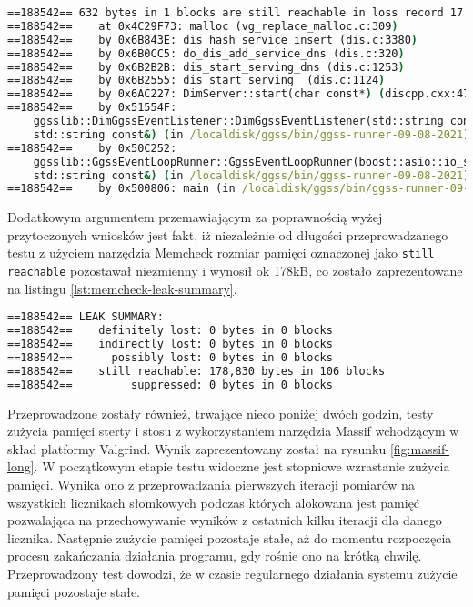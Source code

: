 \begin{lstlisting}[language=cmd,caption={Przykładowy, powodowany przez bibliotekę DIM, błąd raportowany przez narzędzie Memcheck},frame=single, label={lst:memcheck-error}]
==188542== 632 bytes in 1 blocks are still reachable in loss record 17 of 37
==188542==    at 0x4C29F73: malloc (vg_replace_malloc.c:309)
==188542==    by 0x6B843E: dis_hash_service_insert (dis.c:3380)
==188542==    by 0x6B0CC5: do_dis_add_service_dns (dis.c:320)
==188542==    by 0x6B2B2B: dis_start_serving_dns (dis.c:1253)
==188542==    by 0x6B2555: dis_start_serving_ (dis.c:1124)
==188542==    by 0x6AC227: DimServer::start(char const*) (discpp.cxx:476)
==188542==    by 0x51554F: 
    ggsslib::DimGgssEventListener::DimGgssEventListener(std::string const&, 
    std::string const&) (in /localdisk/ggss/bin/ggss-runner-09-08-2021)
==188542==    by 0x50C252: 
    ggsslib::GgssEventLoopRunner::GgssEventLoopRunner(boost::asio::io_service&, 
    std::string const&) (in /localdisk/ggss/bin/ggss-runner-09-08-2021)
==188542==    by 0x500806: main (in /localdisk/ggss/bin/ggss-runner-09-08-2021)
\end{lstlisting}

Dodatkowym argumentem przemawiającym za poprawnością wyżej przytoczonych wniosków jest fakt, iż niezależnie od długości przeprowadzanego testu z użyciem narzędzia Memcheck rozmiar pamięci oznaczonej jako \lstinline{still reachable} pozostawał niezmienny i wynosił ok 178kB, co zostało zaprezentowane na listingu \ref{lst:memcheck-leak-summary}.

\begin{lstlisting}[language=cmd,caption={Podsumowanie wycieków pamięci raportowane przez narzędzie Memcheck},frame=single, label={lst:memcheck-leak-summary}]
==188542== LEAK SUMMARY:
==188542==    definitely lost: 0 bytes in 0 blocks
==188542==    indirectly lost: 0 bytes in 0 blocks
==188542==      possibly lost: 0 bytes in 0 blocks
==188542==    still reachable: 178,830 bytes in 106 blocks
==188542==         suppressed: 0 bytes in 0 blocks
\end{lstlisting}

Przeprowadzone zostały również, trwające nieco poniżej dwóch godzin, testy zużycia pamięci sterty i stosu z wykorzystaniem narzędzia Massif wchodzącym w skład platformy Valgrind. Wynik zaprezentowany został na rysunku \ref{fig:massif-long}. W początkowym etapie testu widoczne jest stopniowe wzrastanie zużycia pamięci. Wynika ono z  przeprowadzania pierwszych iteracji pomiarów na wszystkich licznikach słomkowych podczas których alokowana jest pamięć pozwalająca na przechowywanie wyników z ostatnich kilku iteracji dla danego licznika. Następnie zużycie pamięci pozostaje stałe, aż do momentu rozpoczęcia procesu zakańczania działania programu, gdy rośnie ono na krótką chwilę. Przeprowadzony test dowodzi, że w czasie regularnego działania systemu zużycie pamięci pozostaje stałe.

